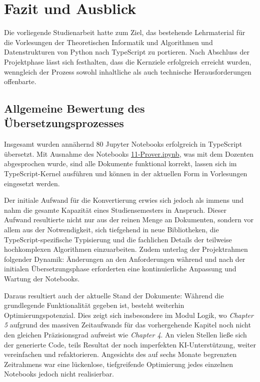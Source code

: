 \section{Fazit und Ausblick}

Die vorliegende Studienarbeit hatte zum Ziel, das bestehende Lehrmaterial für die Vorlesungen der Theoretischen Informatik und Algorithmen und Datenstrukturen von Python nach TypeScript zu portieren. Nach Abschluss der Projektphase lässt sich festhalten, dass die Kernziele erfolgreich erreicht wurden, wenngleich der Prozess sowohl inhaltliche als auch technische Herausforderungen offenbarte. 

\subsection{Allgemeine Bewertung des Übersetzungsprozesses}
Insgesamt wurden annähernd 80 Jupyter Notebooks erfolgreich in TypeScript übersetzt. Mit Ausnahme des Notebooks \href{https://github.com/zLeoll/TS-Translation-for-TheoInf/blob/main/Logic/Chapter-5/11-Prover.ipynb}{11-Prover.ipynb}, was mit dem Dozenten abgesprochen wurde, sind alle Dokumente funktional korrekt, lassen sich im TypeScript-Kernel ausführen und können in der aktuellen Form in Vorlesungen eingesetzt werden. 

Der initiale Aufwand für die Konvertierung erwies sich jedoch als immens und nahm die gesamte Kapazität eines Studiensemesters in Anspruch. Dieser Aufwand resultierte nicht nur aus der reinen Menge an Dokumenten, sondern vor allem aus der Notwendigkeit, sich tiefgehend in neue Bibliotheken, die TypeScript-spezifische Typisierung und die fachlichen Details der teilweise hochkomplexen Algorithmen einzuarbeiten. Zudem unterlag der Projektrahmen folgender Dynamik: Änderungen an den Anforderungen während und nach der initialen Übersetzungsphase erforderten eine kontinuierliche Anpassung und Wartung der Notebooks. 

Daraus resultiert auch der aktuelle Stand der Dokumente: Während die grundlegende Funktionalität gegeben ist, besteht weiterhin Optimierungspotenzial. Dies zeigt sich insbesondere im Modul Logik, wo \textit{Chapter 5} aufgrund des massiven Zeitaufwands für das vorhergehende Kapitel noch nicht den gleichen Präzisionsgrad aufweist wie \textit{Chapter 4}. An vielen Stellen ließe sich der generierte Code, teils Resultat der noch imperfekten KI-Unterstützung, weiter vereinfachen und refaktorieren. Angesichts des auf sechs Monate begrenzten Zeitrahmens war eine lückenlose, tiefgreifende Optimierung jedes einzelnen Notebooks jedoch nicht realisierbar.

